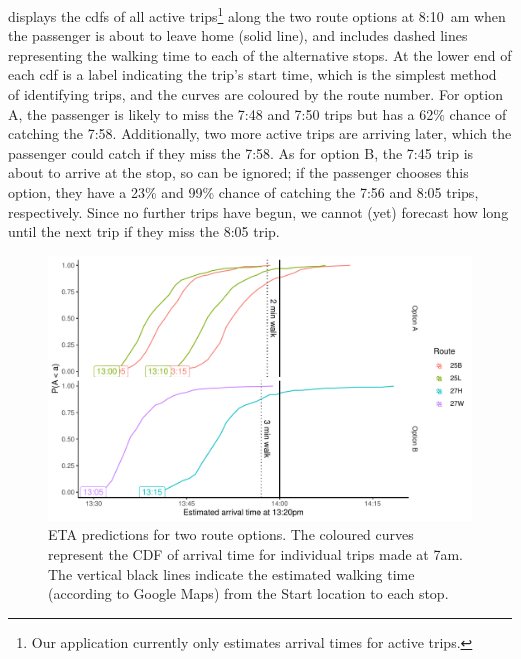  displays the \glspl{cdf} of all active trips\footnote{Our application currently only estimates arrival times for active trips.} along the two route options at 8:10~am when the passenger is about to leave home (solid line), and includes dashed lines representing the walking time to each of the alternative stops. At the lower end of each \gls{cdf} is a label indicating the trip's start time, which is the simplest method of identifying trips, and the curves are coloured by the route number. For option A, the passenger is likely to miss the 7:48 and 7:50 trips but has a 62\% chance of catching the 7:58. Additionally, two more active trips are arriving later, which the passenger could catch if they miss the 7:58. As for option B, the 7:45 trip is about to arrive at the stop, so can be ignored; if the passenger chooses this option, they have a 23\% and 99\% chance of catching the 7:56 and 8:05 trips, respectively. Since no further trips have begun, we cannot (yet) forecast how long until the next trip if they miss the 8:05 trip.



\begin{knitrout}\small
{}\color{fgcolor}\begin{figure}

{\centering \includegraphics[width=\textwidth]{figure/eta_journey_arriveby-1} 

}

\caption[ETA predictions for two route options]{ETA predictions for two route options. The coloured curves represent the CDF of arrival time for individual trips made at 7am. The vertical black lines indicate the estimated walking time (according to Google Maps) from the Start location to each stop.}\label{fig:eta_journey_arriveby}
\end{figure}


\end{knitrout}

